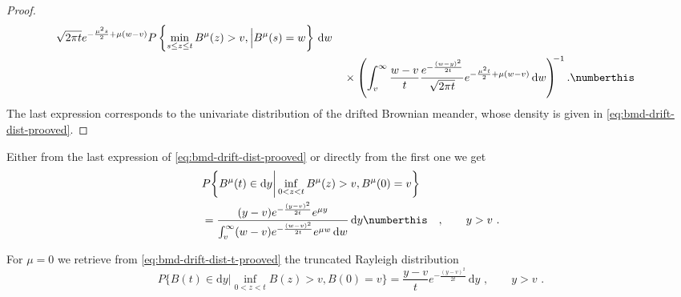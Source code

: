 \begin{corollary}
\begin{proof}
\begin{align*}
{		}{\sqrt{2 \pi t}}
		e^{  - \frac{\mu^2 s}{2} + \mu(w -v)  } 
		P \left\{
		\min_{ s \leq z \leq t  } B^\mu(z) > v, 
		\Big | B^\mu(s ) = w \right\}
		\, \mathrm d w
		\\
		& \quad \times
		\left(
		\int_v^{\infty } 
		\frac{w - v}{t}
		\frac{
			e^{  - \frac{ (w-y)^2}{2t} }	
		}{\sqrt{2 \pi t}}
		e^{  - \frac{\mu^2 t}{2} + \mu(w -v)  } 
		\, \mathrm d w
		\right)^{\!\!-1}. \numberthis 
		\end{align*}
		The last expression corresponds to the univariate distribution of 
		the drifted Brownian meander, whose density is given in \eqref{eq:bmd-drift-dist-prooved}. 
	\end{proof}
\end{corollary}





\begin{remark}

Either from the last expression of \eqref{eq:bmd-drift-dist-prooved} or directly from the first 
one we get
%
%
\begin{align*}
	&
	P \bigg\{  
	B^\mu ( t) \in \mathrm d y \bigg |  \inf_{ 0 < z < t } B^\mu( z)  > v, B^\mu(0) = v  
	\bigg \} 
	\\
	&=
	\frac{
		(y - v )   e^{  - \frac{ (y-v)^2}{2t} } e^{\mu y } 
	}{
		\int_v^\infty (w-v) e^{  - \frac{ (w-v)^2}{2t}   }  e^{ \mu w} \, \mathrm d w
	} \,\mathrm d y
	\numberthis \label{eq:bmd-drift-dist-t-prooved} \quad , \qquad y > v\,\, .
\end{align*}

For $  \mu = 0  $ we retrieve from \eqref{eq:bmd-drift-dist-t-prooved} the truncated Rayleigh distribution 
\[
P \bigg\{  
B ( t) \in \mathrm d y \bigg |  \inf_{ 0 < z < t } B( z)  > v, B(0) = v  
\bigg \} = 
\frac{y - v}{t} e^{  - \frac{(y-v)^2}{2t}  } \,\mathrm d y\,\, , \qquad y > v \,\, .
\]
	
\end{remark}


















